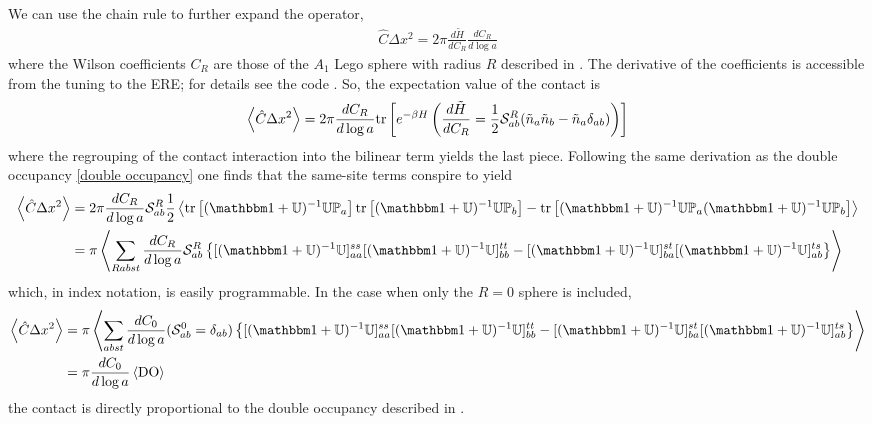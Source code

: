 We can use the chain rule to further expand the operator,
\begin{align}
    \hat{C}\Delta x^2 = 2\pi \frac{d\tilde{H}}{d C_R} \frac{d C_R}{d\log a} 
\end{align}
where the Wilson coefficients $C_R$ are those of the $A_1$ Lego sphere with radius $R$ described in .
The derivative of the coefficients is accessible from the tuning to the ERE; for details see the code .
So, the expectation value of the contact is
\begin{align}
    \left\langle \hat{C} \Delta x^2 \right\rangle
    = 2 \pi \frac{d C_R}{d\log a} \text{tr}\left[e^{-\beta H} \left(\frac{d\tilde{H}}{d C_R} = \frac{1}{2} \mathcal{S}^{R}_{ab} (\tilde{n}_a \tilde{n}_b - \tilde{n}_a \delta_{ab}) \right)\right]
\end{align}
where the regrouping of the contact interaction into the bilinear term yields the last piece.
Following the same derivation as the double occupancy \eqref{double occupancy} one finds that the same-site terms conspire to yield
\begin{align}
    \expectation{\hat{C} \Delta x^2}
    &= 2 \pi \frac{d C_R}{d\log a} \LegoSphere{R}_{ab} \half\expectation{\tr{(\one + \UU)\inverse \UU \PP_a}\tr{(\one + \UU)\inverse \UU \PP_b} - \tr{(\one+\UU)\inverse \UU \PP_a (\one+\UU)\inverse \UU \PP_b}}
    \nonumber\\
    &= \pi \expectation{\sum_{Rabst} \frac{d C_R}{d\log a} \LegoSphere{R}_{ab} \left\{[(\one+\UU)\inverse \UU]^{ss}_{aa} [(\one+\UU)\inverse \UU]^{tt}_{bb} - [(\one+\UU)\inverse \UU]^{st}_{ba} [(\one+\UU)\inverse \UU]^{ts}_{ab} \right\}}
\end{align}
which, in index notation, is easily programmable.
In the case when only the $R=0$ sphere is included,
\begin{align}
    \expectation{\hat{C} \Delta x^2}
    &= \pi \expectation{\sum_{abst} \frac{d C_0}{d\log a} (\LegoSphere{0}_{ab} = \delta_{ab}) \left\{[(\one+\UU)\inverse \UU]^{ss}_{aa} [(\one+\UU)\inverse \UU]^{tt}_{bb} - [(\one+\UU)\inverse \UU]^{st}_{ba} [(\one+\UU)\inverse \UU]^{ts}_{ab} \right\}}
    \nonumber\\
    &= \pi \frac{d C_0}{d\log a} \expectation{ \DoubleOccupancy }
\end{align}
the contact is directly proportional to the double occupancy described in .

